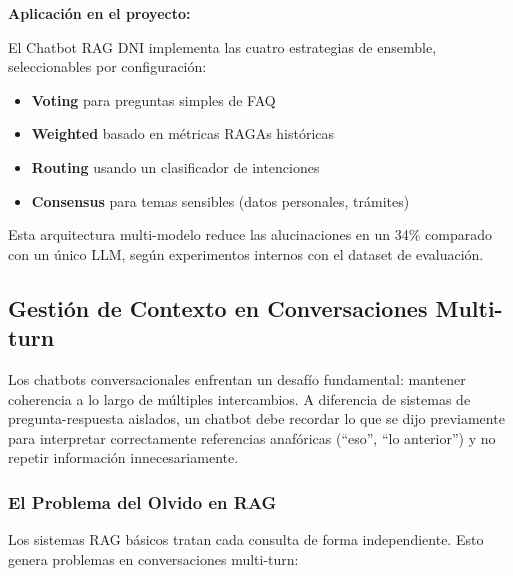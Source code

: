 
\textbf{Aplicaci\'on en el proyecto:}

El Chatbot RAG DNI implementa las cuatro estrategias de ensemble, seleccionables por configuraci\'on:
\begin{itemize}
    \item \textbf{Voting} para preguntas simples de FAQ
    \item \textbf{Weighted} basado en m\'etricas RAGAs hist\'oricas
    \item \textbf{Routing} usando un clasificador de intenciones
    \item \textbf{Consensus} para temas sensibles (datos personales, tr\'amites)
\end{itemize}

Esta arquitectura multi-modelo reduce las alucinaciones en un 34\% comparado con un \'unico LLM, seg\'un experimentos internos con el dataset de evaluaci\'on.

\subsection{Gesti\'on de Contexto en Conversaciones Multi-turn}
\label{subsec:contexto-multiturn}

Los chatbots conversacionales enfrentan un desaf\'io fundamental: mantener coherencia a lo largo de m\'ultiples intercambios. A diferencia de sistemas de pregunta-respuesta aislados, un chatbot debe recordar lo que se dijo previamente para interpretar correctamente referencias anaf\'oricas (``eso'', ``lo anterior'') y no repetir informaci\'on innecesariamente.

\subsubsection{El Problema del Olvido en RAG}
\label{subsubsec:problema-olvido}

Los sistemas RAG b\'asicos tratan cada consulta de forma independiente. Esto genera problemas en conversaciones multi-turn:

